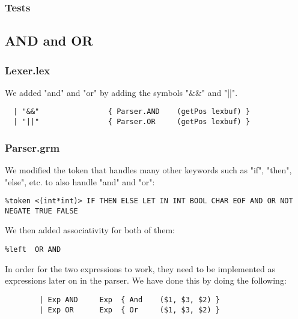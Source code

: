 \documentclass[12pt]{article}
\begin{document}
\subsubsection{Tests}

\subsection{AND and OR}
\subsubsection{Lexer.lex}
We added "and" and "or" by adding the symbols "\(\&\&\)" and "||". 
\begin{verbatim}
  | "&&"                { Parser.AND    (getPos lexbuf) }
  | "||"                { Parser.OR     (getPos lexbuf) }
\end{verbatim}
\subsubsection{Parser.grm}
We modified the token that handles many other keywords such as "if", "then", "else", etc. to also handle "and" and "or":
\begin{verbatim}
%token <(int*int)> IF THEN ELSE LET IN INT BOOL CHAR EOF AND OR NOT NEGATE TRUE FALSE
\end{verbatim}
We then added associativity for both of them: 
\begin{verbatim}
%left  OR AND
\end{verbatim}
In order for the two expressions to work, they need to be implemented as expressions later on in the parser. We have done this by doing the following:
\begin{verbatim}
        | Exp AND     Exp  { And    ($1, $3, $2) }
        | Exp OR      Exp  { Or     ($1, $3, $2) }
\end{verbatim}
\end{document}
